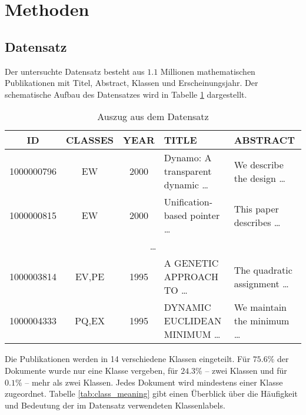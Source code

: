 \section{Methoden}


\subsection{Datensatz}
\label{sub:datensatz}
Der untersuchte Datensatz besteht aus $1.1$ Millionen mathematischen Publikationen mit Titel, Abstract, Klassen und Erscheinungsjahr.
Der schematische Aufbau des Datensatzes wird in Tabelle \ref{tab:data} dargestellt.

\begin{table}[h]
    \begin{tabular}{cccll}
        \tiny\textbf{ID} &\tiny \textbf{CLASSES} &\tiny \textbf{YEAR} &\tiny \textbf{TITLE} & \tiny \textbf{ABSTRACT} \\
        \hline
        \tiny 1000000796 &\tiny EW & \tiny 2000 & \tiny Dynamo: A transparent dynamic \dots  & \tiny We describe the design \dots \\
        \tiny 1000000815 &\tiny EW & \tiny 2000 & \tiny Unification-based pointer \dots  & \tiny This paper describes \dots \\
        \multicolumn{5}{c}{\dots} \\
        \tiny 1000003814 &\tiny EV,PE & \tiny 1995 & \tiny A GENETIC APPROACH TO \dots  & \tiny The quadratic assignment \dots \\
        \tiny 1000004333 & \tiny PQ,EX &\tiny 1995 &\tiny DYNAMIC EUCLIDEAN MINIMUM \dots & \tiny We maintain the minimum \dots \\
    \end{tabular}
    \caption{Auszug aus dem Datensatz}
    \label{tab:data}
\end{table}


Die Publikationen werden in 14 verschiedene Klassen eingeteilt.
Für $75.6 \%$ der Dokumente wurde nur eine Klasse vergeben, für $24.3 \%$ -- zwei Klassen und für $0.1 \%$ -- mehr als zwei Klassen.
Jedes Dokument wird mindestens einer Klasse zugeordnet.
Tabelle \ref{tab:class_meaning} gibt einen Überblick über die Häufigkeit und Bedeutung der im Datensatz verwendeten Klassenlabels.



